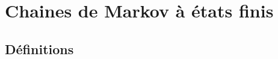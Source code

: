 \documentclass{article}
\begin{document}
\newpage

% 

\section{Chaines de Markov à états finis}

\subsection{Définitions}

\end{document}
